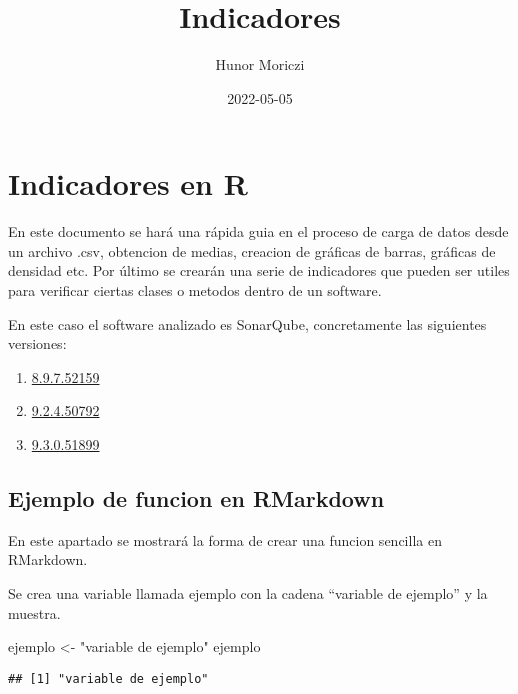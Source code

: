 \documentclass[
]{article}
\title{Indicadores}
\author{Hunor Moriczi}
\date{2022-05-05}
\newenvironment{Shaded}{\begin{snugshade}}{\end{snugshade}}
\newcommand{\NormalTok}[1]{#1}
\newcommand{\OtherTok}[1]{\textcolor[rgb]{0.56,0.35,0.01}{#1}}
\newcommand{\StringTok}[1]{\textcolor[rgb]{0.31,0.60,0.02}{#1}}
\providecommand{\tightlist}{%
  \setlength{\itemsep}{0pt}\setlength{\parskip}{0pt}}
\begin{document}
\maketitle

\hypertarget{indicadores-en-r}{%
\section{Indicadores en R}\label{indicadores-en-r}}

En este documento se hará una rápida guia en el proceso de carga de
datos desde un archivo .csv, obtencion de medias, creacion de gráficas
de barras, gráficas de densidad etc. Por último se crearán una serie de
indicadores que pueden ser utiles para verificar ciertas clases o
metodos dentro de un software.

En este caso el software analizado es SonarQube, concretamente las
siguientes versiones:

\begin{enumerate}
\def\labelenumi{\arabic{enumi}.}
\tightlist
\item
  \href{https://github.com/SonarSource/sonarqube/releases/tag/8.9.7.52159}{8.9.7.52159}
\item
  \href{https://github.com/SonarSource/sonarqube/releases/tag/9.2.4.50792}{9.2.4.50792}
\item
  \href{https://github.com/SonarSource/sonarqube/releases/tag/9.3.0.51899}{9.3.0.51899}
\end{enumerate}

\hypertarget{ejemplo-de-funcion-en-rmarkdown}{%
\subsection{Ejemplo de funcion en
RMarkdown}\label{ejemplo-de-funcion-en-rmarkdown}}

En este apartado se mostrará la forma de crear una funcion sencilla en
RMarkdown.

Se crea una variable llamada ejemplo con la cadena ``variable de
ejemplo'' y la muestra.

\begin{Shaded}
\begin{Highlighting}[]
\NormalTok{ejemplo }\OtherTok{\textless{}{-}} \StringTok{"variable de ejemplo"}
\NormalTok{ejemplo}
\end{Highlighting}
\end{Shaded}

\begin{verbatim}
## [1] "variable de ejemplo"
\end{verbatim}
\end{document}
